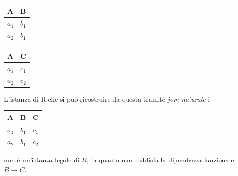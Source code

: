     \begin{multicols}{2}   
    \begin{flushright}
    \begin{tabular}{l|l}
     A & B \\
     \hline
     $a_1$ & $b_1$\\
     $a_2$ & $b_1$
    \end{tabular}
    \end{flushright}

    \begin{flushleft}
    \begin{tabular}{l|l}
     A & C \\
     \hline
     $a_1$ & $c_1$\\
     $a_2$ & $c_2$
    \end{tabular}
    \end{flushleft}
    \end{multicols}  
 
  L'istanza di R che si può ricostruire da questa tramite \emph{join naturale} è\\
    \begin{center}
    \begin{tabular}{l|l|l}
     A & B & C \\
     \hline
     $a_1$ &$b_1$ & $c_1$\\
     $a_2$ &$b_1$ & $c_2$
    \end{tabular}
    \end{center}
    
    non è un'istanza legale di $R$, in quanto non soddisfa la dipendenza funzionale
    $B\rightarrow C$.

